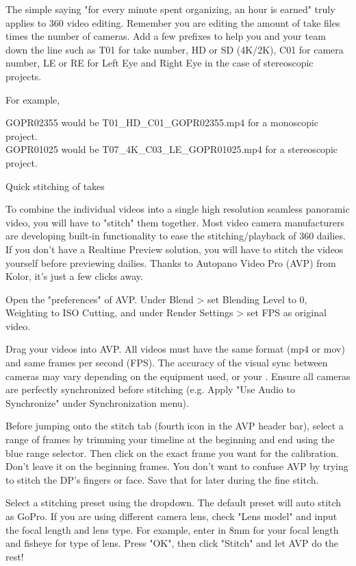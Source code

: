 \begin{fullwidth}
The simple saying "for every minute spent organizing, an hour is earned" truly applies to 360 video editing. Remember you are editing the amount of take files times the number of cameras. Add a few prefixes to help you and your team down the line such as T01 for take number, HD or SD (4K/2K), C01 for camera number, LE or RE for Left Eye and Right Eye in the case of stereoscopic projects.

For example,

GOPR02355 would be T01\_HD\_C01\_GOPR02355.mp4 for a monoscopic project.
\\
GOPR01025 would be T07\_4K\_C03\_LE\_GOPR01025.mp4 for a stereoscopic project.

{\large Quick stitching of takes \par}

To combine the individual videos into a single high resolution seamless panoramic video, you will have to "stitch" them together. Most video camera manufacturers are developing built-in functionality to ease the stitching/playback of 360 dailies. If you don't have a Realtime Preview solution, you will have to stitch the videos yourself before previewing dailies. Thanks to Autopano Video Pro (AVP) from Kolor, it's just a few clicks away.

Open the "preferences" of AVP. Under Blend > set Blending Level to 0, Weighting to ISO Cutting, and under Render Settings > set FPS as original video.


Drag your videos into AVP. All videos must have the same format (mp4 or mov) and same frames per second (FPS). The accuracy of the visual sync between cameras may vary depending on the equipment used, or your \textbf{}. Ensure all cameras are perfectly synchronized before stitching (e.g. Apply "Use Audio to Synchronize" under Synchronization menu).


Before jumping onto the stitch tab (fourth icon in the AVP header bar), select a range of frames by trimming your timeline at the beginning and end using the blue range selector. Then click on the exact frame you want for the calibration. Don't leave it on the beginning frames. You don't want to confuse AVP by trying to stitch the DP's fingers or face. Save that for later during the fine stitch. 


Select a stitching preset using the dropdown. The default preset will auto stitch as GoPro. If you are using different camera lens, check "Lens model" and input the focal length and lens type. For example, enter in 8mm for your focal length and fisheye for type of lens. Press "OK", then click "Stitch" and let AVP do the rest!


\end{fullwidth}
